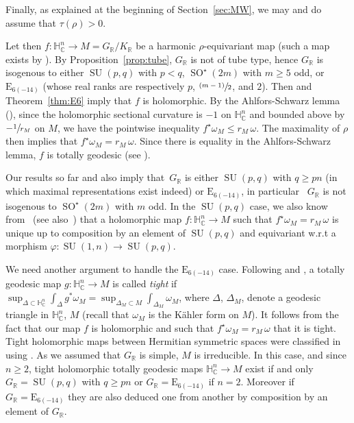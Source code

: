 \documentclass[JEP,XML,SOM,Unicode,NoFloatCountersInSection]{cedram}
\newcommand{\psfrac}[2]{\sfrac{(#1)}{#2}}
\newcommand{\citestar}[3]{\cite[#3]{#1}}
\theoremstyle{plain}
\theoremstyle{definition}
\DeclareMathOperator{\SO}{SO}
\DeclareMathOperator{\SU}{SU}
\newcommand{\bR}{\mathbb{R}}
\newcommand{\HC}{{\mathbb{H}^n_\mathbb{C}}}
\newcommand{\rkm}{{r_M}}
\begin{document}
Finally, as explained at the beginning of Section~\ref{sec:MW}, we may and do assume that $\tau(\rho)>0$.

Let then $f: \HC \to M =G_\bR/K_\bR$ be a harmonic $\rho$-equivariant map
(such a map exists by \cite{CorletteFlatGBundles}).
By Proposition~\ref{prop:tube}, $G_\bR$ is not of tube type, hence $G_\bR$ is isogenous to
either $\SU(p,q)$ with $p<q$, $\SO^\star(2m)$ with $m\geq 5$ odd, or $\mathrm{E}_{6(-14)}$ (whose
real ranks are respectively $p$, $\psfrac{m-1}2$, and $2$). Then
\citestar{KM}*{Th.\,4.1 \& Prop.\,5.6} and Theorem~\ref{thm:E6} imply that $f$ is holomorphic.
By the Ahlfors-Schwarz lemma (\cf \cite{Royden}), since the holomorphic sectional
curvature is $-1$ on $\HC$ and bounded above by $-\sfrac 1\rkm$ on $M$, we have the pointwise
inequality $f^\star \omega_M\leq \rkm \,\omega$. The maximality of $\rho$ then implies that
$f^\star\omega_M=\rkm\,\omega$.
Since there is equality in the Ahlfors-Schwarz lemma, $f$ is totally geodesic (see \eg \cite{Royden}).

Our results so far and \citestar{KM}*{Prop.\,4.10 \& 5.7} also imply that~$G_\bR$ is
either $\SU(p,q)$ with $q\geq pn$ (in which maximal representations exist indeed) or $\mathrm{E}_{6(-14)}$,
in particular~ $G_\bR$ is not isogenous to $\SO^\star(2m)$ with $m$ odd. In the $\SU(p,q)$ case,
we also know from~\citestar{KMrank2}*{} (see also~\citestar{KM}*{Prop.\,4.10})
that a holomorphic map $f:\HC\to M$ such that $f^\star\omega_M=\rkm\,\omega$ is unique up to composition by
an element of $\SU(p,q)$ and equivariant w.r.t a morphism
$\varphi:\SU(1,n)\to\SU(p,q)$.

We need another argument to handle the $\mathrm{E}_{6(-14)}$ case.
Following \citestar{BIW}*{p.\,690} and \citestar{Hamlet}*{p.640}, a totally geodesic map $g:\HC \to M$
is called \emph{tight} if
$\sup_{\Delta \subset \HC} \int_\Delta g^* \omega_M= \sup_{\Delta_M \subset M} \int_{\Delta_M}
\omega_M$, where $\Delta$, \resp $\Delta_M$, denote a geodesic triangle in $\HC$, \resp $M$
(recall that $\omega_M$ is the Kähler form on $M$).
It follows from the fact that our map $f$ is holomorphic and such that $f^\star\omega_M=\rkm\,\omega$
that it is tight.
Tight holomorphic maps between Hermitian
symmetric spaces were classified in~\cite{Hamlet} using \cite{ihara}.
As we assumed that $G_\bR$ is simple, $M$ is irreducible. In this case, and since $n\geq 2$, tight
holomorphic totally geodesic maps $\HC\to M$ exist if and only
$G_\bR=\SU(p,q)$ with $q\geq pn$ or $G_\bR=\mathrm{E}_{6(-14)}$ if $n=2$.
Moreover if $G_\bR=\mathrm{E}_{6(-14)}$ they are also
deduced one from another by composition by an element of $G_\bR$.
\end{document}
